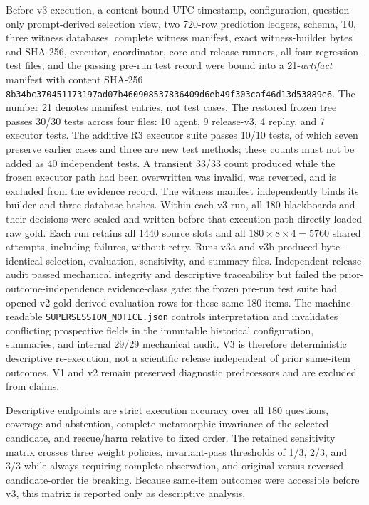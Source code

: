\documentclass[applsci,article,submit,moreauthors]{Definitions/mdpi}
\begin{document}
Before v3 execution, a content-bound UTC timestamp, configuration, question-only prompt-derived selection view, two 720-row prediction ledgers, schema, T0, three witness databases, complete witness manifest, exact witness-builder bytes and SHA-256, executor, coordinator, core and release runners, all four regression-test files, and the passing pre-run test record were bound into a 21-\emph{artifact} manifest with content SHA-256 \texttt{8b34bc370451173197ad07b460908537836409d6eb49f303caf46d13d53889e6}. The number 21 denotes manifest entries, not test cases. The restored frozen tree passes 30/30 tests across four files: 10 agent, 9 release-v3, 4 replay, and 7 executor tests. The additive R3 executor suite passes 10/10 tests, of which seven preserve earlier cases and three are new test methods; these counts must not be added as 40 independent tests. A transient 33/33 count produced while the frozen executor path had been overwritten was invalid, was reverted, and is excluded from the evidence record. The witness manifest independently binds its builder and three database hashes. Within each v3 run, all 180 blackboards and their decisions were sealed and written before that execution path directly loaded raw gold. Each run retains all 1440 source slots and all $180\times8\times4=5760$ shared attempts, including failures, without retry. Runs v3a and v3b produced byte-identical selection, evaluation, sensitivity, and summary files. Independent release audit passed mechanical integrity and descriptive traceability but failed the prior-outcome-independence evidence-class gate: the frozen pre-run test suite had opened v2 gold-derived evaluation rows for these same 180 items. The machine-readable \texttt{SUPERSESSION\_NOTICE.json} controls interpretation and invalidates conflicting prospective fields in the immutable historical configuration, summaries, and internal 29/29 mechanical audit. V3 is therefore deterministic descriptive re-execution, not a scientific release independent of prior same-item outcomes. V1 and v2 remain preserved diagnostic predecessors and are excluded from claims.

Descriptive endpoints are strict execution accuracy over all 180 questions, coverage and abstention, complete metamorphic invariance of the selected candidate, and rescue/harm relative to fixed order. The retained sensitivity matrix crosses three weight policies, invariant-pass thresholds of 1/3, 2/3, and 3/3 while always requiring complete observation, and original versus reversed candidate-order tie breaking. Because same-item outcomes were accessible before v3, this matrix is reported only as descriptive analysis.
\end{document}
